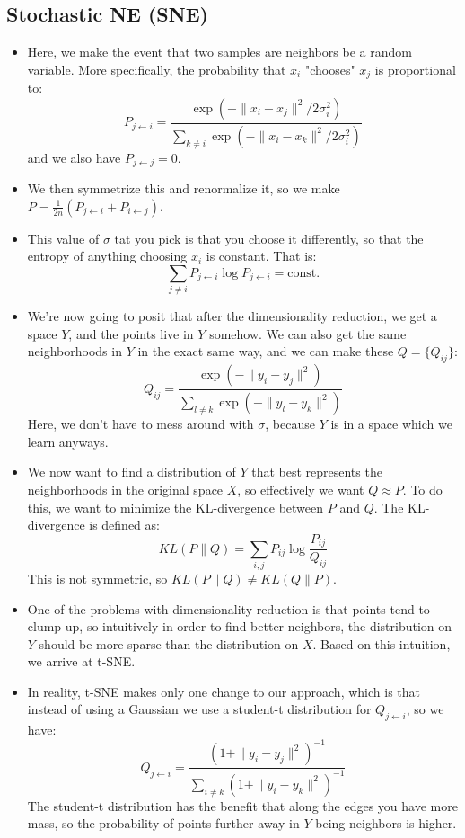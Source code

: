 \subsection{Stochastic NE (SNE)}
\begin{itemize}
	\item Here, we make the event that two samples are neighbors be a random
		variable. More specifically, the probability that \( x_i \) "chooses" \( x_j
		\) is proportional to:
		\[
			P_{j \leftarrow i} = \frac{\exp\left( -\|x_i - x_j\|^2
			/2\sigma_i^2\right)}{\sum_{k \neq i} \exp(-\|x_i - x_k\|^2 /2
			\sigma_i^2)}
		\]
		and we also have \( P_{j \leftarrow j} = 0 \). 

	\item We then symmetrize this and renormalize it, so we make \( P =
		\frac{1}{2n}(P_{j \leftarrow i} + P_{i \leftarrow j}) \). 
	\item This value of \( \sigma \) tat you pick is that you choose it differently,
		so that the entropy of anything choosing \( x_i \) is constant. That is:
		\[
			\sum_{j \neq i}P_{j \leftarrow i} \log P_{j \leftarrow i} = \text{const.}
		\]
	\item We're now going to posit that after the dimensionality reduction, we get a
		space \( Y \), and the points live in \( Y \) somehow. We can also get the
		same neighborhoods in \( Y \) in the exact same way, and we can make these \(
		Q = \{Q_{ij}\}\):
		\[
			Q_{ij} = \frac{\exp\left( -\|y_i - y_j\|^2 \right)}{\sum_{l \neq
			k}\exp\left( -\|y_l - y_k\|^2 \right)}
		\]
		Here, we don't have to mess around with \( \sigma \), because \( Y \) is in a
		space which we learn anyways. 
	\item We now want to find a distribution of \( Y \) that best represents the
		neighborhoods in the original space \( X \), so effectively we want \( Q
		\approx P \). To do this, we want to minimize the KL-divergence between \( P
		\) and \( Q \). The KL-divergence is defined as:
		\[
			KL(P \parallel Q) = \sum_{i, j} P_{ij} \log \frac{P_{ij}}{Q_{ij}}
		\]
		This is not symmetric, so \( KL(P \parallel Q) \neq KL(Q \parallel P) \). 
	\item One of the problems with dimensionality reduction is that points tend to
		clump up, so intuitively in order to find better neighbors, the distribution
		on \( Y \) should be more sparse than the distribution on \( X \). Based on
		this intuition, we arrive at t-SNE. 
	\item In reality, t-SNE makes only one change to our approach, which is that
		instead of using a Gaussian we use a student-t distribution for \( Q_{j
		\leftarrow i} \), so we have:
		\[
			Q_{j \leftarrow i} = \frac{\left( 1 + \|y_i - y_j\|^2
			\right)^{-1}}{\sum_{i \neq k} (1 + \|y_i - y_k\|^2)^{-1}}
		\]
		The student-t distribution has the benefit that along the edges you have more
		mass, so the probability of points further away in \( Y \) being neighbors is
		higher. 
\end{itemize}


